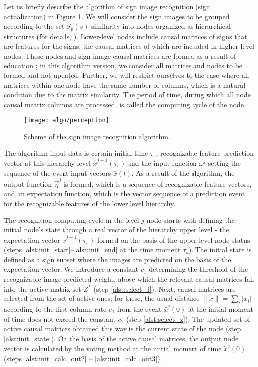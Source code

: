 \documentclass[12pt]{scrartcl}
\begin{document}
	Let us briefly describe the algorithm of sign image recognition (sign actualization) in Figure \ref{fig:percept}. We will consider the sign images to be grouped according to the set $S_p(s)$ similarity into nodes organized as hierarchical structures (for details, \cite{Osipov2015d}). Lower-level nodes include causal matrices of signs that are features for the signs, the causal matrices of which are included in higher-level nodes. These nodes and sign image causal matrices are formed as a result of education \cite{Skrynnik2016}; in this algorithm version, we consider all matrices and nodes to be formed and not updated. Further, we will restrict ourselves to the case where all matrices within one node have the same number of columns, which is a natural condition due to the matrix similarity. The period of time, during which all node causal matrix columns are processed, is called the computing cycle of the node.
	
	\begin{figure}
		\centering
		\texttt{[image: algo/perception]}
		\caption{Scheme of the sign image recognition algorithm.}
		\label{fig:percept}		
	\end{figure}

	The algorithm input data is certain initial time $\tau_s$, recognizable feature prediction vector at this hierarchy level $\hat x^{j+1}(\tau_s)$ and the input function $\omega^j$ setting the sequence of the event input vectors $\bar x(t)$. As a result of the algorithm, the output function $\vec \eta^j$ is formed, which is a sequence of recognizable feature vectors, and an expectation function, which is the vector sequence of a prediction event for the recognizable features of the  lower level hierarchy.
	
	The recognition computing cycle in the level $j$ node starts with defining the initial node’s state through a real vector of the hierarchy upper level - the expectation vector $\hat x^{j+1}(\tau_s)$ formed on the basis of the upper level node status (steps \ref{alst:init_start}--\ref{alst:init_end} at the time moment $\tau_s$). The initial state is defined as a sign subset where the images are predicted on the basis of the expectation vector. We introduce a constant $c_1$ determining the threshold of the recognizable image predicted weight, above which the relevant causal matrices fall into the active matrix set $Z^*$ (step \ref{alst:select_f}). Next, causal matrices are selected from the set of active ones; for these, the usual distance $\|x\|=\sum_i |x_i|$ according to the first column rate $e_1$ from the event $\bar x^j(0)$ at the initial moment of time does not exceed the constant $c_2$ (step \ref{alst:select_z}). The updated set of active causal matrices obtained this way is the current state of the node (step \ref{alst:init_state}). On the basis of the active causal matrices, the output node vector is calculated by the voting method at the initial moment of time $\tilde x^j(0)$ (steps \ref{alst:init_calc_out2} -- \ref{alst:init_calc_out3}).
	
\end{document}
